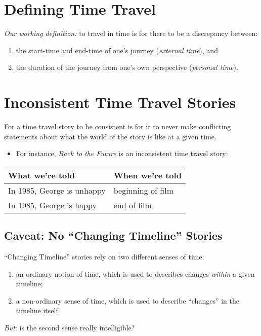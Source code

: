 \documentclass[12pt]{extarticle}
\begin{document}

\section{Defining Time Travel}

\emph{Our working definition:} to travel in time is for there to be a discrepancy between: 

\begin{enumerate}
\item the start-time and end-time of one's journey (\textit{external time}), and

\item the duration of the journey from one's own perspective (\textit{personal time}).

\end{enumerate}

\section{Inconsistent Time Travel Stories}

For a time travel story to be consistent is for it to never make conflicting statements about what the world of the story is like at a given time.

\begin{itemize}
\item For instance, \emph{Back to the Future} is  an inconsistent time travel story:

\end{itemize}
 \begin{center}
    \begin{tabular}{l|l}
      \textbf{What we're told} & \textbf{When we're told} \\
      \hline
      In 1985, George is unhappy & beginning of film\\
      In 1985, George is happy & end of film\\
    \end{tabular}
  \end{center}

\subsection{Caveat: No ``Changing Timeline'' Stories}

``Changing Timeline'' stories rely on two different senses of time:


\begin{enumerate}

\item an ordinary notion of time, which is used to describes changes \emph{within} a given timeline;
\item a non-ordinary sense of time, which is used to describe ``changes'' in the timeline itself.

\end{enumerate}
\emph{But}: is the second sense really intelligible?
\end{document}
